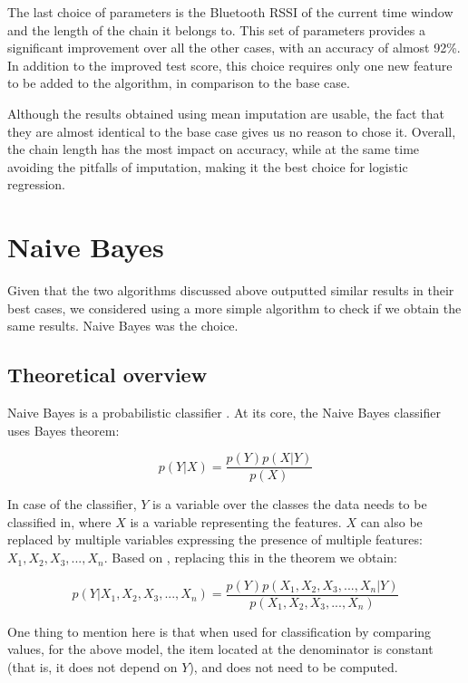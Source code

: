 The last choice of parameters is the Bluetooth RSSI of the current time window and the length of the chain it belongs to. This set of parameters provides a significant improvement over all the other cases, with an accuracy of almost 92\%. In addition to the improved test score, this choice requires only one new feature to be added to the algorithm, in comparison to the base case.

Although the results obtained using mean imputation are usable, the fact that they are almost identical to the base case gives us no reason to chose it. Overall, the chain length has the most impact on accuracy, while at the same time avoiding the pitfalls of imputation, making it the best choice for logistic regression. 

\section{Naive Bayes}

Given that the two algorithms discussed above outputted similar results in their best cases, we considered using a more simple algorithm to check if we obtain the same results. Naive Bayes was the choice.

\subsection{Theoretical overview}

Naive Bayes is a probabilistic classifier \cite{forty}. At its core, the Naive Bayes classifier uses Bayes theorem:

\begin{equation*}
p(Y \vert X) = \frac{p(Y)p(X \vert Y)}{p(X)}
\end{equation*}

In case of the classifier, $Y$ is a variable over the classes the data needs to be classified in, where $X$ is a variable representing the features. $X$ can also be replaced by multiple variables expressing the presence of multiple features: $X_1,X_2,X_3,..., X_n $. Based on \cite{forty}, replacing this in the theorem we obtain:

\begin{equation*}
p(Y\vert X_1,X_2,X_3,..., X_n) = \frac{p(Y)p(X_1,X_2,X_3,..., X_n\vert Y)}{p(X_1,X_2,X_3,..., X_n)}
\end{equation*}

One thing to mention here is that when used for classification by comparing values, for the above model, the item located at the denominator is constant (that is, it does not depend on $Y$), and does not need to be computed. 

